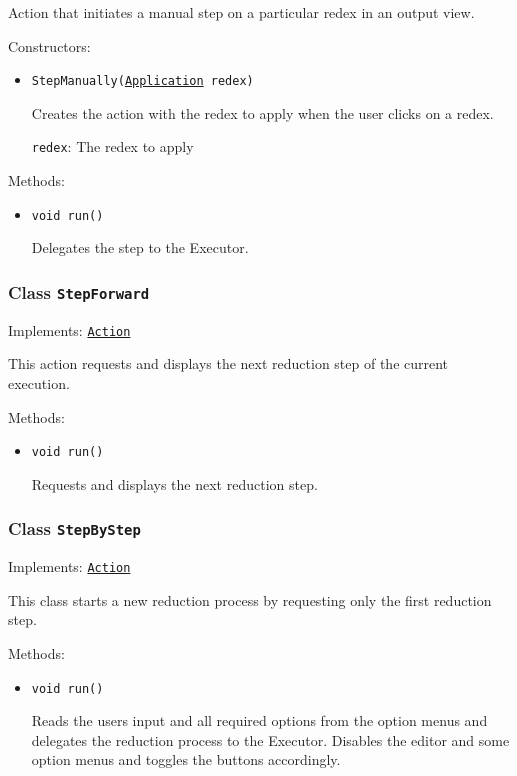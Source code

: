 Action that initiates a manual step on a particular redex in an output view.

Constructors:
\begin{itemize}
\item \texttt{StepManually(\hyperref[type:edu.kit.wavelength.client.model.term.Application]{Application} redex)}

Creates the action with the redex to apply when the user clicks on a
 redex.

\texttt{redex}: The redex to apply

\end{itemize}

Methods:
\begin{itemize}
\item \texttt{void run()}

Delegates the step to the Executor.

\end{itemize}

\subsubsection{Class \texttt{StepForward}}
\label{type:edu.kit.wavelength.client.view.action.StepForward}
Implements: \texttt{\hyperref[type:edu.kit.wavelength.client.view.action.Action]{Action}}

This action requests and displays the next reduction step of the current
 execution.

Methods:
\begin{itemize}
\item \texttt{void run()}

Requests and displays the next reduction step.

\end{itemize}

\subsubsection{Class \texttt{StepByStep}}
\label{type:edu.kit.wavelength.client.view.action.StepByStep}
Implements: \texttt{\hyperref[type:edu.kit.wavelength.client.view.action.Action]{Action}}

This class starts a new reduction process by requesting only the first
 reduction step.

Methods:
\begin{itemize}
\item \texttt{void run()}

Reads the users input and all required options from the option menus and
 delegates the reduction process to the Executor. Disables the editor and some
 option menus and toggles the buttons accordingly.

\end{itemize}


